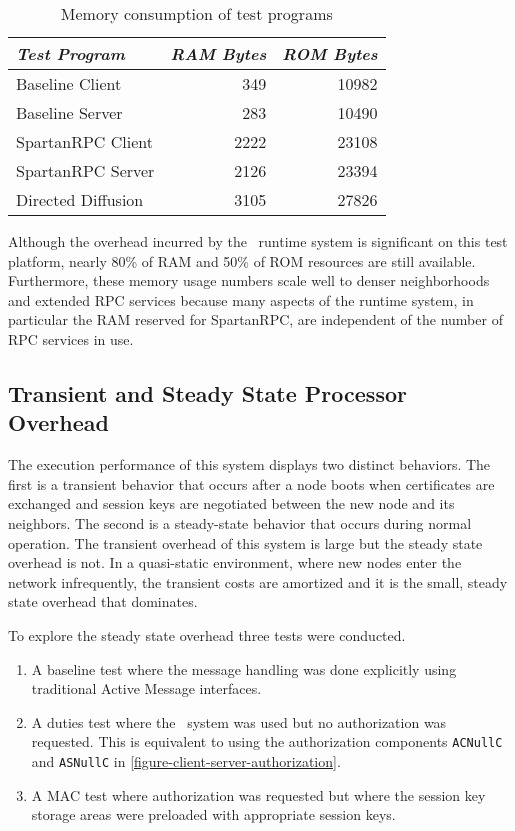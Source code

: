 \begin{table}[!t]
  \newcommand\T{\rule{0pt}{2.1ex}}
  \centering
  \caption{Memory consumption of test programs}
  {
  \begin{tabular}{|l|r|r|} \hline
    \textit{Test Program} \T & \textit{RAM Bytes} & \textit{ROM Bytes} \\
    \hline \hline

    Baseline Client    \T &  349 & 10982 \\ \hline 
    Baseline Server    \T &  283 & 10490 \\ \hline
    SpartanRPC Client  \T & 2222 & 23108 \\ \hline
    SpartanRPC Server  \T & 2126 & 23394 \\ \hline
    Directed Diffusion \T & 3105 & 27826 \\ \hline
  \end{tabular}
  }
  \label{table-test-program-ram}
\end{table}

Although the overhead incurred by the \Sprocket\ runtime system is significant on this test
platform, nearly 80\% of RAM and 50\% of ROM resources are still available. Furthermore, these
memory usage numbers scale well to denser neighborhoods and extended RPC services because many
aspects of the runtime system, in particular the RAM reserved for SpartanRPC, are independent of
the number of RPC services in use.

\subsection{Transient and Steady State Processor Overhead}
\label{section-sprocket-cpu-performance}

The execution performance of this system displays two distinct behaviors. The first is a
transient behavior that occurs after a node boots when certificates are exchanged and session
keys are negotiated between the new node and its neighbors. The second is a steady-state
behavior that occurs during normal operation. The transient overhead of this system is large but
the steady state overhead is not. In a quasi-static environment, where new nodes enter the
network infrequently, the transient costs are amortized and it is the small, steady state
overhead that dominates.

To explore the steady state overhead three tests were conducted.
\begin{enumerate}
\item A baseline test where the message handling was done explicitly using traditional Active
  Message interfaces.
\item A duties test where the \Sprocket\ system was used but no authorization was requested.
  This is equivalent to using the authorization components \texttt{ACNullC} and \texttt{ASNullC}
  in \autoref{figure-client-server-authorization}.
\item A MAC test where authorization was requested but where the session key storage areas were
  preloaded with appropriate session keys.
\end{enumerate}

